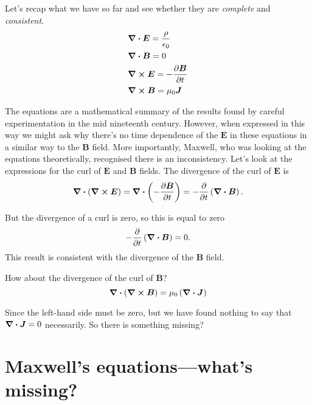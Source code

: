 \documentclass[12pt,chapterprefix=false,dvipsnames]{scrbook}
\theoremstyle{dotless}
\theoremstyle{definition}
\begin{document}
Let's recap what we have so far and see whether they are
\textit{complete} and \textit{consistent}.
\begin{equation}
	\begin{aligned}
		 & \divergence{\bm{E}} = \frac{\rho}{\epsilon_{0}} \\
		 & \divergence{\bm{B}} = 0                         \\
		 & \curl{\bm{E}} = -\pdv{\bm{B}}{t}                \\
		 & \curl{\bm{B}} = \mu_{0}\bm{J}
	\end{aligned}
\end{equation}

The equations are a mathematical summary of the results found by
careful experimentation in the mid nineteenth century. However,
when expressed in this way we might ask why there's no time
dependence of the $\bm{E}$ in these equations in
a similar way to the $\bm{B}$ field. More
importantly, Maxwell, who was looking at the equations
theoretically, recognised there is an inconsistency. Let's look
at the expressions for the curl of $\bm{E}$ and
$\bm{B}$ fields. The divergence of the curl of
$\bm{E}$ is
\begin{equation}
	\label{eq:divergence_curl_of_e}%
	\divergence{\left(\curl{\bm{E}}\right)}
	=
	\divergence{\left(-\pdv{\bm{B}}{t}\right)}
	=
	-\pdv{}{t}\left(\divergence{\bm{B}}\right).
\end{equation}

But the divergence of a curl is zero, so this is equal to zero
\begin{equation}
	-\pdv{}{t}\left(\divergence{\bm{B}}\right) = 0.
\end{equation}
This result is consistent with the divergence of the
$\bm{B}$ field.

How about the divergence of the curl of $\bm{B}$?
\begin{equation}
	\divergence{\left(\curl{\bm{B}}\right)} =
	\mu_{0}\left(\divergence{\bm{J}}\right)
\end{equation}

Since the left-hand side must be zero, but we have found nothing
to say that $\divergence{\bm{J}} = 0$ necessarily. So there is
something missing?

\section{Maxwell's equations---what's missing?}%
\label{sec:maxwell_s_equations_what_s_missing_}
\end{document}
